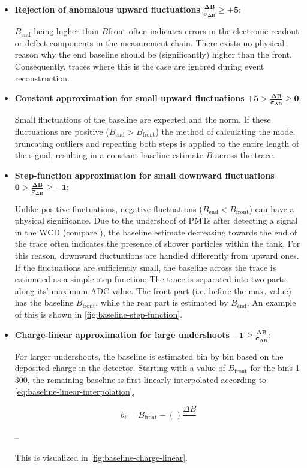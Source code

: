 \begin{itemize}
	\item \textbf{Rejection of anomalous upward fluctuations} $\mathbf{\frac{\Delta B}{\sigma_{\Delta B}} \geq +5}$:

	$B_\text{end}$ being higher than $B\text{front}$ often indicates errors in the electronic readout or defect components in the measurement chain. There exists
	no physical reason why the end baseline should be (significantly) higher than the front. Consequently, traces where this is the case are ignored during 
	event reconstruction.

	\item \textbf{Constant approximation for small upward fluctuations} $\mathbf{+5 > \frac{\Delta B}{\sigma_{\Delta B}} \geq 0}$:

	Small fluctuations of the baseline are expected and the norm. If these fluctuations are positive ($B_\text{end} > B_\text{front}$) the method of calculating 
	the mode, truncating outliers and repeating both steps is applied to the entire length of the signal, resulting in a constant baseline estimate $B$ across 
	the trace.

	\item \textbf{Step-function approximation for small downward fluctuations} $\mathbf{0 > \frac{\Delta B}{\sigma_{\Delta B}} \geq -1}$:

	Unlike positive fluctuations, negative fluctuations ($B_\text{end} < B_\text{front}$) can have a physical significance. Due to the undershoof of PMTs after
	detecting a signal in the WCD (compare \cite{glietta2008recovery}), the baseline estimate decreasing towards the end of the trace often indicates the presence
	of shower particles within the tank. For this reason, downward fluctuations are handled differently from upward ones. If the fluctuations are sufficiently 
	small, the baseline across the trace is estimated as a simple step-function; The trace is separated into two parts along its' maximum ADC value. The front part 
	(i.e. before the max. value) has the baseline $B_\text{front}$, while the rear part is estimated by $B_\text{end}$. An example of this is shown in 
	\autoref{fig:baseline-step-function}.

	\item \textbf{Charge-linear approximation for large undershoots} $\mathbf{-1 \geq \frac{\Delta B}{\sigma_{\Delta B}}}$:

	For larger undershoots, the baseline is estimated bin by bin based on the deposited charge in the detector. Starting with a value of $B_\text{front}$ for the bins 
	1-300, the remaining baseline is first linearly interpolated according to \autoref{eq:baseline-linear-interpolation},

	\begin{equation}
	\label{eq:baseline-linear-interpolation}
		b_i = B_\text{front} - () \frac{\Delta B}{}  
	\end{equation}
	
	--

	This is visualized in \autoref{fig:baseline-charge-linear}.

\end{itemize}

